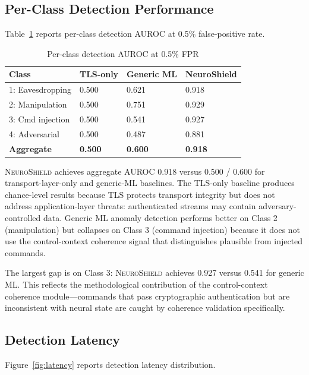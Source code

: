 \documentclass[sigconf,nonacm]{acmart}
\begin{document}
\subsection{Per-Class Detection Performance}

Table~\ref{tab:perclass} reports per-class detection AUROC at 0.5\%
false-positive rate.

\begin{table}[h]
\caption{Per-class detection AUROC at 0.5\% FPR}
\label{tab:perclass}
\small
\begin{tabularx}{\columnwidth}{@{}p{2.6cm}X X X@{}}
\toprule
\textbf{Class} & \textbf{TLS-only} & \textbf{Generic ML} & \textbf{NeuroShield} \\
\midrule
1: Eavesdropping & 0.500 & 0.621 & 0.918 \\
2: Manipulation  & 0.500 & 0.751 & 0.929 \\
3: Cmd injection & 0.500 & 0.541 & 0.927 \\
4: Adversarial   & 0.500 & 0.487 & 0.881 \\
\midrule
\textbf{Aggregate} & \textbf{0.500} & \textbf{0.600} & \textbf{0.918} \\
\bottomrule
\end{tabularx}
\end{table}

\textsc{NeuroShield} achieves aggregate AUROC 0.918 versus 0.500 /
0.600 for transport-layer-only and generic-ML baselines. The
TLS-only baseline produces chance-level results because TLS protects
transport integrity but does not address application-layer threats:
authenticated streams may contain adversary-controlled data.
Generic ML anomaly detection performs better on Class 2
(manipulation) but collapses on Class 3 (command injection)
because it does not use the control-context coherence signal that
distinguishes plausible from injected commands.

The largest gap is on Class 3: \textsc{NeuroShield} achieves 0.927
versus 0.541 for generic ML. This reflects the methodological
contribution of the control-context coherence module---commands
that pass cryptographic authentication but are inconsistent with
neural state are caught by coherence validation specifically.

\subsection{Detection Latency}

Figure~\ref{fig:latency} reports detection latency distribution.
\end{document}
